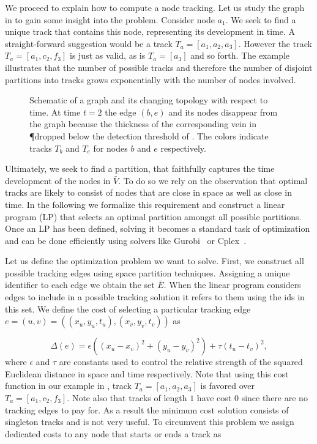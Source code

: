 		We proceed to explain how to compute a node tracking. Let us study the graph in  to gain some insight into the problem. Consider \eg node $a_1$. We seek to find a unique track that contains this node, representing its development in time. A straight-forward suggestion would be a track $T_a = [a_1,a_2,a_3]$. However the track $T_a = [a_1,c_2,f_3]$ is just as valid, as is $T_a = [a_3]$ and so forth. The example illustrates that the number of possible tracks and therefore the number of disjoint partitions into tracks grows exponentially with the number of nodes involved. 


		\begin{figure}
		
		
		
		\caption[Schematic description of node tracking.]{Schematic of a graph and its changing topology with respect to time. At time $t=2$ the edge $(b,e)$ and its nodes disappear from the graph because the thickness of the corresponding vein in \P dropped below the detection threshold of \NEFI. The colors indicate tracks $T_b$ and $T_e$ for nodes $b$ and $e$ respectively.}
		\label{fig:tracking}
		\end{figure}

		Ultimately, we seek to find a partition, that faithfully captures the time development of the nodes in $\bar{V}$. To do so we rely on the observation that optimal tracks are likely to consist of nodes that are close in space as well as close in time. In the following we formalize this requirement and construct a linear program (LP) that selects an optimal partition amongst all possible partitions. Once an LP has been defined, solving it becomes a standard task of optimization and can be done efficiently using solvers like Gurobi~\cite{optimization2012gurobi} or Cplex~\cite{cplex2005high}.

		Let us define the optimization problem we want to solve. First, we construct all possible tracking edges using space partition techniques. Assigning a unique identifier to each edge we obtain the set $\bar{E}$. When the linear program considers edges to include in a possible tracking solution it refers to them using the ids in this set. We define the cost of selecting a particular tracking edge $e = (u,v) = ((x_u,y_u,t_u), (x_v,y_v,t_v))$ as

		\begin{equation}
		\Delta(e) = \epsilon ((x_u - x_v)^2 + (y_u - y_v)^2 ) + \tau (t_u - t_v)^2,
		\end{equation}
		where $\epsilon$ and $\tau$ are constants used to control the relative strength of the squared Euclidean distance in space and time respectively. Note that using this cost function in our example in , track $T_a = [a_1,a_2,a_3]$ is favored over $T_a = [a_1,c_2,f_3]$. Note also that tracks of length $1$ have cost $0$ since there are no tracking edges to pay for. As a result the minimum cost solution consists of singleton tracks and is not very useful. To circumvent this problem we assign dedicated costs to any node that starts or ends a track as


